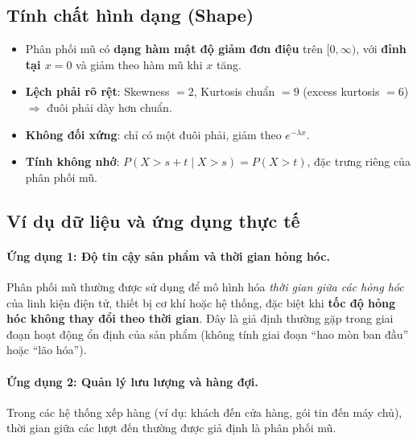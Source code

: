 \subsection{Tính chất hình dạng (Shape)}

\begin{itemize}
    \item Phân phối mũ có \textbf{dạng hàm mật độ giảm đơn điệu} trên $[0,\infty)$, với \textbf{đỉnh tại $x=0$} và giảm theo hàm mũ khi $x$ tăng.
    \item \textbf{Lệch phải rõ rệt}: Skewness $= 2$, Kurtosis chuẩn $= 9$ (excess kurtosis $= 6$) $\Rightarrow$ đuôi phải dày hơn chuẩn.
    \item \textbf{Không đối xứng}: chỉ có một đuôi phải, giảm theo $e^{-\lambda x}$.
    \item \textbf{Tính không nhớ}: $P(X > s + t \mid X > s) = P(X > t)$, đặc trưng riêng của phân phối mũ.
\end{itemize}

\subsection{Ví dụ dữ liệu và ứng dụng thực tế}

\paragraph{Ứng dụng 1: Độ tin cậy sản phẩm và thời gian hỏng hóc.}  
Phân phối mũ thường được sử dụng để mô hình hóa \textit{thời gian giữa các hỏng hóc} của linh kiện điện tử, thiết bị cơ khí hoặc hệ thống, đặc biệt khi \textbf{tốc độ hỏng hóc không thay đổi theo thời gian}. Đây là giả định thường gặp trong giai đoạn hoạt động ổn định của sản phẩm (không tính giai đoạn “hao mòn ban đầu” hoặc “lão hóa”).

\paragraph{Ứng dụng 2: Quản lý lưu lượng và hàng đợi.}  
Trong các hệ thống xếp hàng (ví dụ: khách đến cửa hàng, gói tin đến máy chủ), thời gian giữa các lượt đến thường được giả định là phân phối mũ.
